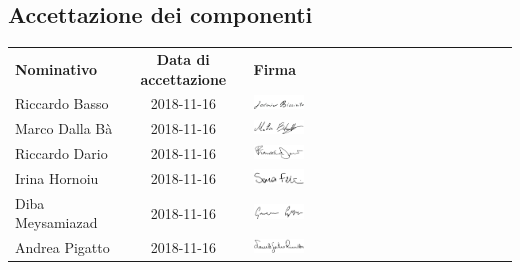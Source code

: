 \subsection{Accettazione dei componenti}
\begin{table}[H]
	\centering\renewcommand{\arraystretch}{1.5}
	
	\begin{tabular}{l c M{0.35\textwidth}}
		
		
		\rowcolorhead 
		{ \textbf{Nominativo}} &
		{ \textbf{Data di accettazione}} &
		{ \textbf{Firma}}  \\
		
		\rowcolorlight
		Riccardo Basso & 2018-11-16 &   	\includegraphics[width=0.2\textwidth]{res/images/firme/federico.png}\\  
		\rowcolordark
		Marco Dalla Bà & 2018-11-16 &     	\includegraphics[width=0.2\textwidth]{res/images/firme/mattia.png}\\  
		\rowcolorlight
		Riccardo Dario & 2018-11-16 &   	\includegraphics[width=0.2\textwidth]{res/images/firme/francesco.png}\\  
		\rowcolordark
		Irina Hornoiu & 2018-11-16 &   	\includegraphics[width=0.2\textwidth]{res/images/firme/sara.png}\\  
		\rowcolorlight
		Diba Meysamiazad & 2018-11-16 &   	\includegraphics[width=0.2\textwidth]{res/images/firme/giacomo.png}\\ 
		\rowcolordark
		Andrea Pigatto & 2018-11-16 &   	\includegraphics[width=0.2\textwidth]{res/images/firme/samuele.png}\\   
	\end{tabular}
\end{table}

